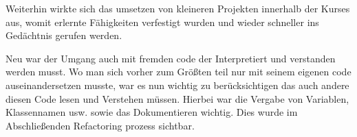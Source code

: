 Weiterhin wirkte  sich das umsetzen von kleineren Projekten innerhalb der Kurses aus, womit erlernte Fähigkeiten  verfestigt wurden und wieder schneller ins Gedächtnis gerufen werden.%


Neu war der Umgang auch mit fremden code der Interpretiert und verstanden werden musst. Wo man sich vorher zum Größten teil nur mit seinem eigenen code auseinandersetzen musste, war es nun wichtig zu berücksichtigen das auch andere diesen Code lesen und Verstehen müssen. Hierbei war die Vergabe von Variablen, Klassennamen usw. sowie das Dokumentieren wichtig. Dies wurde im Abschließenden Refactoring prozess sichtbar.







